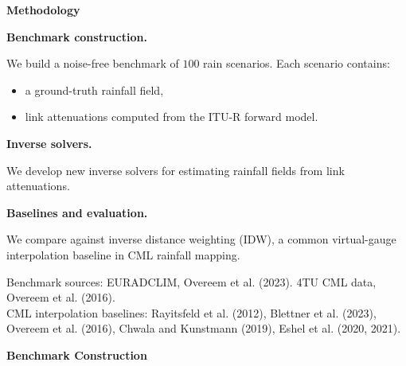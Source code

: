 \documentclass[aspectratio=169]{beamer}
\begin{document}
\begin{frame}[plain]
    \vspace{-0.5mm}
    \begin{center}\large\bfseries Methodology\end{center}
    \vspace{5mm}

    \textbf{Benchmark construction.}

    \vspace{1mm}
    We build a noise-free benchmark of $100$ rain scenarios. Each scenario contains:
    \begin{itemize}
        \item a ground-truth rainfall field,
        \item link attenuations computed from the ITU-R forward model.
    \end{itemize}

    \vspace{3mm}
    \textbf{Inverse solvers.}

    \vspace{1mm}
    We develop new inverse solvers for estimating rainfall fields from link attenuations.

    \vspace{3mm}
    \textbf{Baselines and evaluation.}

    \vspace{1mm}
    We compare against inverse distance weighting (IDW), a common virtual-gauge interpolation baseline in CML rainfall mapping.

    \vfill
    {\tiny Benchmark sources: EURADCLIM, Overeem et al. (2023). 4TU CML data, Overeem et al. (2016). \\
        CML interpolation baselines: Rayitsfeld et al. (2012), Blettner et al. (2023), Overeem et al. (2016), Chwala and Kunstmann (2019), Eshel et al. (2020, 2021).}
\end{frame}

{
    \usebackgroundtemplate{}
    \begin{frame}[plain]
        \vspace{-0.5mm}
        \begin{center}\large\bfseries Benchmark Construction\end{center}
        \vspace{-2mm}
        \centering
        \resizebox{0.985\textwidth}{0.84\textheight}{}
    \end{frame}
}
\end{document}
